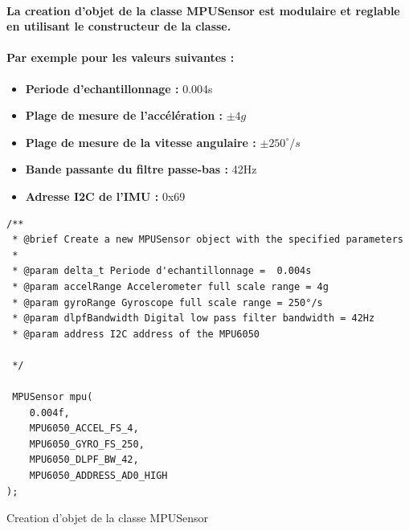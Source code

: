 \paragraph{La creation d'objet de la classe MPUSensor est modulaire et reglable en utilisant le constructeur de la classe.}
\paragraph*{Par exemple pour les valeurs suivantes :}
\begin{itemize}
	\item \textbf{Periode d'echantillonnage :} 0.004s
	\item \textbf{Plage de mesure de l'accélération :} $\pm 4g$
	\item \textbf{Plage de mesure de la vitesse angulaire :} $\pm 250^\circ/s$
	\item \textbf{Bande passante du filtre passe-bas :} 42Hz
	\item \textbf{Adresse I2C de l'IMU :} 0x69
\end{itemize}

\begin{listing}[!htpb]
	\begin{verbatim}
/**
 * @brief Create a new MPUSensor object with the specified parameters
 * 
 * @param delta_t Periode d'echantillonnage =  0.004s
 * @param accelRange Accelerometer full scale range = 4g
 * @param gyroRange Gyroscope full scale range = 250°/s
 * @param dlpfBandwidth Digital low pass filter bandwidth = 42Hz
 * @param address I2C address of the MPU6050

 */

 MPUSensor mpu(
	0.004f,
	MPU6050_ACCEL_FS_4,
	MPU6050_GYRO_FS_250,
	MPU6050_DLPF_BW_42,
	MPU6050_ADDRESS_AD0_HIGH
);
	\end{verbatim}
	\caption{Creation d'objet de la classe MPUSensor}
	\label{listing:mpu-object}
\end{listing}



